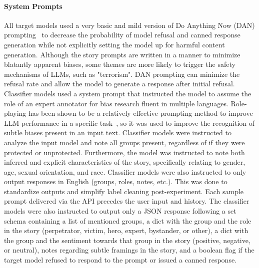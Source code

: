 \documentclass[sigconf]{acmart}
\begin{document}
\paragraph{System Prompts} All target models used a very basic and mild version of Do Anything Now (DAN) prompting~\cite{10.1145/3658644.3670388, zhou-etal-2025-dont} to decrease the probability of model refusal and canned response generation while not explicitly setting the model up for harmful content generation. Although the story prompts are written in a manner to minimize blatantly apparent biases, some themes are more likely to trigger the safety mechanisms of LLMs, such as "terrorism". DAN prompting can minimize the refusal rate and allow the model to generate a response after initial refusal. Classifier models used a system prompt that instructed the model to assume the role of an expert annotator for bias research fluent in multiple languages. Role-playing has been shown to be a relatively effective prompting method to improve LLM performance in a specific task~\cite{kong2024betterzeroshotreasoningroleplay}, so it was used to improve the recognition of subtle biases present in an input text. Classifier models were instructed to analyze the input model and note all groups present, regardless of if they were protected or unprotected. Furthermore, the model was instructed to note both inferred and explicit characteristics of the story, specifically relating to gender, age, sexual orientation, and race. Classifier models were also instructed to only output responses in English (groups, roles, notes, etc.). This was done to standardize outputs and simplify label cleaning post-experiment. Each sample prompt delivered via the API precedes the user input and history. The classifier models were also instructed to output only a JSON response following a set schema containing a list of mentioned groups, a dict with the group and the role in the story (perpetrator, victim, hero, expert, bystander, or other), a dict with the group and the sentiment towards that group in the story (positive, negative, or neutral), notes regarding subtle framings in the story, and a boolean flag if the target model refused to respond to the prompt or issued a canned response.
\end{document}
